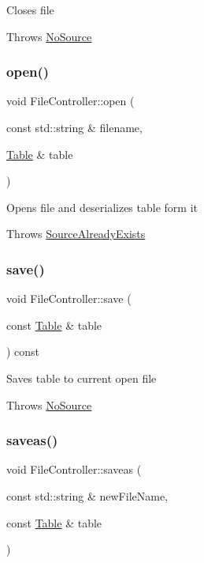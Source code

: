Closes file

Throws \hyperlink{structNoSource}{No\+Source} \mbox{\label{classFileController_a3e559be5fba16c52aba8e82eea63c654}} 
\subsubsection{\texorpdfstring{open()}{open()}}
{\footnotesize\ttfamily void File\+Controller\+::open (\begin{DoxyParamCaption}\item[{const std\+::string \&}]{filename,  }\item[{\hyperlink{classTable}{Table} \&}]{table }\end{DoxyParamCaption})}

Opens file and deserializes table form it

Throws \hyperlink{structSourceAlreadyExists}{Source\+Already\+Exists} \mbox{\label{classFileController_a9ed5c3b640ad19438a660e1c7a201695}} 
\subsubsection{\texorpdfstring{save()}{save()}}
{\footnotesize\ttfamily void File\+Controller\+::save (\begin{DoxyParamCaption}\item[{const \hyperlink{classTable}{Table} \&}]{table }\end{DoxyParamCaption}) const}

Saves table to current open file

Throws \hyperlink{structNoSource}{No\+Source} \mbox{\label{classFileController_af258e978bb75dd280187a7ee3b2c64ae}} 
\subsubsection{\texorpdfstring{saveas()}{saveas()}}
{\footnotesize\ttfamily void File\+Controller\+::saveas (\begin{DoxyParamCaption}\item[{const std\+::string \&}]{new\+File\+Name,  }\item[{const \hyperlink{classTable}{Table} \&}]{table }\end{DoxyParamCaption})}

